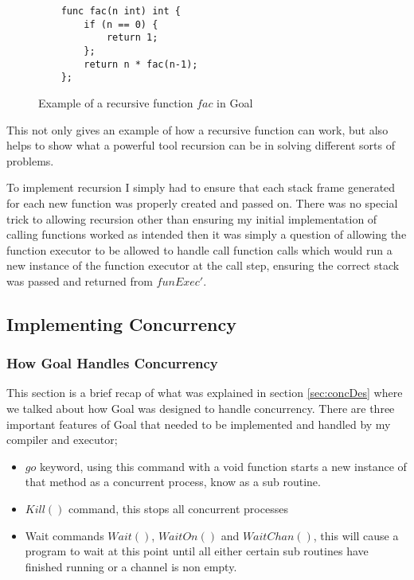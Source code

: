 \begin{figure}
\begin{lstlisting}
	func fac(n int) int {
	    if (n == 0) {
	        return 1;
	    }; 
	    return n * fac(n-1);
	};
\end{lstlisting}
\caption{Example of a recursive function $fac$ in Goal}
\label{fig:facExamp}
\end{figure}

This not only gives an example of how a recursive function can work, but also helps to show what a powerful tool recursion can be in solving different sorts of problems. 

To implement recursion I simply had to ensure that each stack frame generated for each new function was properly created and passed on. There was no special trick to allowing recursion other than ensuring my initial implementation of calling functions worked as intended then it was simply a question of allowing the function executor to be allowed to handle call function calls which would run a new instance of the function executor at the call step, ensuring the correct stack was passed and returned from $funExec'$. 

\subsection{Implementing Concurrency}

\subsubsection{How Goal Handles Concurrency}

This section is a brief recap of what was explained in section \ref{sec:concDes} where we talked about how Goal was designed to handle concurrency. There are three important features of Goal that needed to be implemented and handled by my compiler and executor;

\begin{itemize}
\item $go$ keyword, using this command with a void function starts a new instance of that method as a concurrent process, know as a sub routine.
\item $Kill()$ command, this stops all concurrent processes 
\item Wait commands $Wait()$, $WaitOn()$ and $WaitChan()$, this will cause a program to wait at this point until all either certain sub routines have finished running or a channel is non empty.
\end{itemize}

